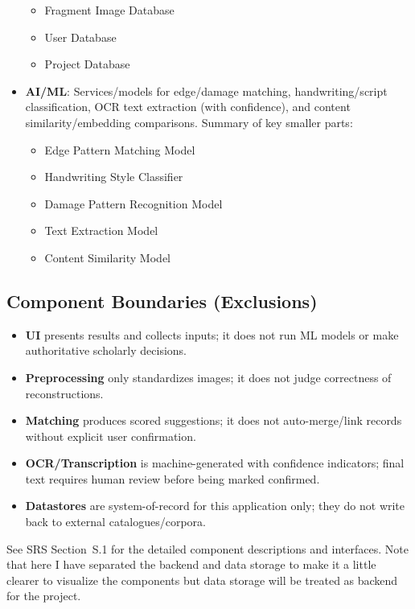 \documentclass{article}
\begin{document}
\begin{itemize}
\begin{itemize}
    \item Fragment Image Database
    \item User Database
    \item Project Database
   \end{itemize}
  \item \textbf{AI/ML}: Services/models for edge/damage matching, handwriting/script classification, OCR text extraction (with confidence), and content similarity/embedding comparisons. Summary of key smaller parts:
  \begin{itemize} 
    \item Edge Pattern Matching Model
    \item Handwriting Style Classifier
    \item Damage Pattern Recognition Model
    \item Text Extraction Model
    \item Content Similarity Model
   \end{itemize}
\end{itemize}

\subsection*{Component Boundaries (Exclusions)}
\begin{itemize}
  \item \textbf{UI} presents results and collects inputs; it does not run ML models or make authoritative scholarly decisions.
  \item \textbf{Preprocessing} only standardizes images; it does not judge correctness of reconstructions.
  \item \textbf{Matching} produces scored suggestions; it does not auto-merge/link records without explicit user confirmation.
  \item \textbf{OCR/Transcription} is machine-generated with confidence indicators; final text requires human review before being marked confirmed.
  \item \textbf{Datastores} are system-of-record for this application only; they do not write back to external catalogues/corpora.
\end{itemize}

See SRS Section~S.1 for the detailed component descriptions and interfaces. Note that here I have separated the backend and data storage to make it a little clearer to visualize the components but data storage will be treated as backend for the project.
\end{document}
